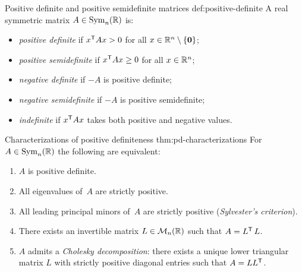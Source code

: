 \begin{definition}{Positive definite and positive semidefinite matrices}%
{def:positive-definite}
A real symmetric matrix $A\in\operatorname{Sym}_n({\mathbb{R}})$ is:
\begin{itemize}
  \item \emph{positive definite}
    if ${x}^{\mathsf{T}}Ax > 0$ for all $x\in{\mathbb{R}}^n\setminus\left\{\mathbf{0}\right\}$;
  \item \emph{positive semidefinite}
    if ${x}^{\mathsf{T}}Ax \geq 0$ for all $x\in{\mathbb{R}}^n$;
  \item \emph{negative definite} if $-A$ is positive definite;
  \item \emph{negative semidefinite} if $-A$ is positive semidefinite;
  \item \emph{indefinite} if ${x}^{\mathsf{T}}Ax$ takes both positive and
    negative values.
\end{itemize}
\end{definition}

\begin{theorem}{Characterizations of positive definiteness}%
{thm:pd-characterizations}
For $A\in\operatorname{Sym}_n({\mathbb{R}})$ the following are equivalent:
\begin{enumerate}[label=\textup{(\roman*)}]
  \item $A$ is positive definite.
  \item All eigenvalues of~$A$ are strictly positive.
  \item All leading principal minors of~$A$ are strictly positive
    (\emph{Sylvester's criterion}).
  \item There exists an invertible matrix $L\in\mathcal{M}_n({\mathbb{R}})$ such that
    $A = {L}^{\mathsf{T}}\,L$.
  \item $A$ admits a \emph{Cholesky decomposition}:
    there exists a unique lower triangular matrix $L$ with strictly positive
    diagonal entries such that $A = L{L}^{\mathsf{T}}$.
\end{enumerate}
\end{theorem}

